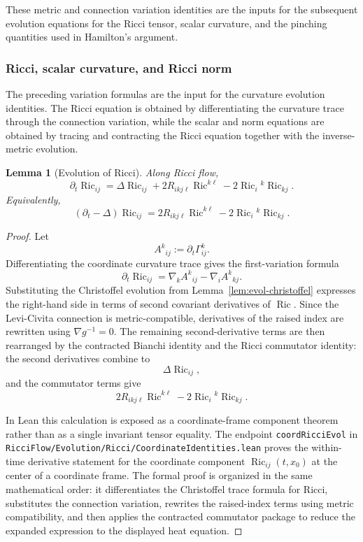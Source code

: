 \documentclass[11pt]{article}
\theoremstyle{plain}
\newtheorem{lemma}[theorem]{Lemma}
\theoremstyle{definition}
\theoremstyle{remark}
\newcommand{\Ric}{\operatorname{Ric}}
\newcommand{\leanref}[1]{\nolinkurl{#1}}
\newcommand{\leanfile}[1]{\nolinkurl{#1}}
\newcommand{\rffile}[1]{\leanfile{#1}}
\begin{document}
These metric and connection variation identities are the inputs for the
subsequent evolution equations for the Ricci tensor, scalar curvature, and the
pinching quantities used in Hamilton's argument.

\subsubsection{Ricci, scalar curvature, and Ricci norm}

The preceding variation formulas are the input for the curvature evolution
identities.  The Ricci equation is obtained by differentiating the curvature
trace through the connection variation, while the scalar and norm equations are
obtained by tracing and contracting the Ricci equation together with the
inverse-metric evolution.

\begin{lemma}[Evolution of Ricci]
\label{lem:evol-ricci}
Along Ricci flow,
\[
\partial_t\Ric_{ij}
=
\Delta\Ric_{ij}
+2R_{ikj\ell}\Ric^{k\ell}
-2\Ric_i{}^k\Ric_{kj}.
\]
Equivalently,
\[
(\partial_t-\Delta)\Ric_{ij}
=
2R_{ikj\ell}\Ric^{k\ell}
-2\Ric_i{}^k\Ric_{kj}.
\]
\end{lemma}

\begin{proof}
Let
\[
  A^k{}_{ij}:=\partial_t\Gamma^k_{ij}.
\]
Differentiating the coordinate curvature trace gives the first-variation formula
\[
  \partial_t\Ric_{ij}
  =
  \nabla_k A^k{}_{ij}
  -
  \nabla_i A^k{}_{kj}.
\]
Substituting the Christoffel evolution from Lemma~\ref{lem:evol-christoffel}
expresses the right-hand side in terms of second covariant derivatives of
\(\Ric\).  Since the Levi-Civita connection is metric-compatible, derivatives of
the raised index are rewritten using \(\nabla g^{-1}=0\).  The remaining
second-derivative terms are then rearranged by the contracted Bianchi identity
and the Ricci commutator identity: the second derivatives combine to
\[
  \Delta\Ric_{ij},
\]
and the commutator terms give
\[
  2R_{ikj\ell}\Ric^{k\ell}
  -
  2\Ric_i{}^k\Ric_{kj}.
\]

In Lean this calculation is exposed as a coordinate-frame component theorem
rather than as a single invariant tensor equality.  The endpoint
\leanref{coordRicciEvol} in
\rffile{RicciFlow/Evolution/Ricci/CoordinateIdentities.lean} proves the
within-time derivative statement for the coordinate component
\(\Ric_{ij}(t,x_0)\) at the center of a coordinate frame.  The formal proof is
organized in the same mathematical order: it differentiates the Christoffel
trace formula for Ricci, substitutes the connection variation, rewrites the
raised-index terms using metric compatibility, and then applies the contracted
commutator package to reduce the expanded expression to the displayed heat
equation.
\end{proof}
\end{document}
